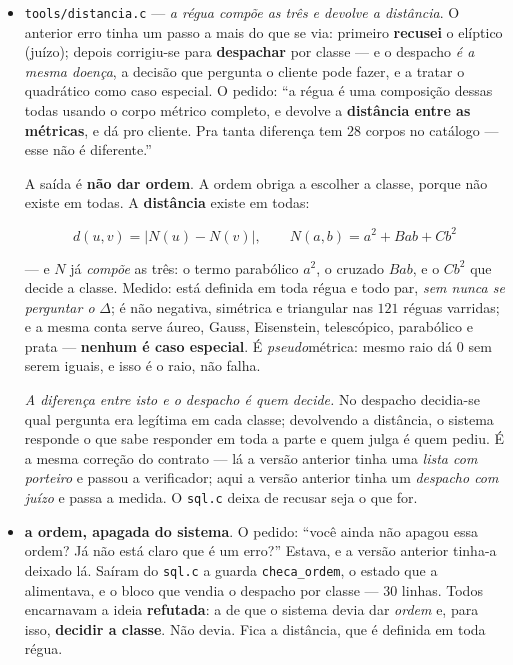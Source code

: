 \documentclass[11pt]{article}
\newcommand{\code}[1]{\texttt{\small #1}}
\theoremstyle{plain}
\theoremstyle{remark}
\begin{document}
\begin{itemize}
\emph{O erro, dito:} mediu-se que não há ordem linear --- \textbf{verdade} --- e escrevi ``a pergunta
é mal posta, recusa'' --- \textbf{juízo}. É o mesmo de ``não é corpo'' e de ``o entrópico é uma
condenação'': tomar a metade que falta pela estrutura toda.
\item \code{tools/distancia.c} --- \emph{a régua compõe as três e devolve a distância}. O anterior
erro tinha um passo a mais do que se via: primeiro \textbf{recusei} o elíptico (juízo); depois
corrigiu-se para \textbf{despachar} por classe --- e o despacho \emph{é a mesma doença}, a decisão
que pergunta o cliente pode fazer, e a tratar o quadrático como caso especial. O pedido: ``a régua
é uma composição dessas todas usando o corpo métrico completo, e devolve a \textbf{distância entre
as métricas}, e dá pro cliente. Pra tanta diferença tem $28$ corpos no catálogo --- esse não é
diferente.''

A saída é \textbf{não dar ordem}. A ordem obriga a escolher a classe, porque não existe em todas.
A \textbf{distância} existe em todas:

\[ d(u,v) = |N(u) - N(v)|, \qquad N(a,b) = a^2 + Bab + Cb^2 \]

--- e $N$ já \emph{compõe} as três: o termo parabólico $a^2$, o cruzado $Bab$, e o $Cb^2$ que
decide a classe. Medido: está definida em toda régua e todo par, \emph{sem nunca se perguntar o}
$\Delta$; é não negativa, simétrica e triangular nas $121$ réguas varridas; e a mesma conta serve
áureo, Gauss, Eisenstein, telescópico, parabólico e prata --- \textbf{nenhum é caso especial}. É
\emph{pseudo}métrica: mesmo raio dá $0$ sem serem iguais, e isso é o raio, não falha.

\emph{A diferença entre isto e o despacho é quem decide.} No despacho decidia-se qual pergunta era
legítima em cada classe; devolvendo a distância, o sistema responde o que sabe responder em toda a
parte e quem julga é quem pediu. É a mesma correção do contrato --- lá a versão anterior tinha uma \emph{lista com
porteiro} e passou a verificador; aqui a versão anterior tinha um \emph{despacho com juízo} e passa a medida. O
\code{sql.c} deixa de recusar seja o que for.
\item \textbf{a ordem, apagada do sistema}. O pedido: ``você ainda não apagou essa ordem? Já não
está claro que é um erro?'' Estava, e a versão anterior tinha-a deixado lá. Saíram do \code{sql.c} a guarda
\code{checa\_ordem}, o estado que a alimentava, e o bloco que vendia o despacho por classe ---
$30$ linhas. Todos encarnavam a ideia \textbf{refutada}: a de que o sistema devia dar \emph{ordem}
e, para isso, \textbf{decidir a classe}. Não devia. Fica a distância, que é definida em toda régua.


\end{itemize}
\end{document}
